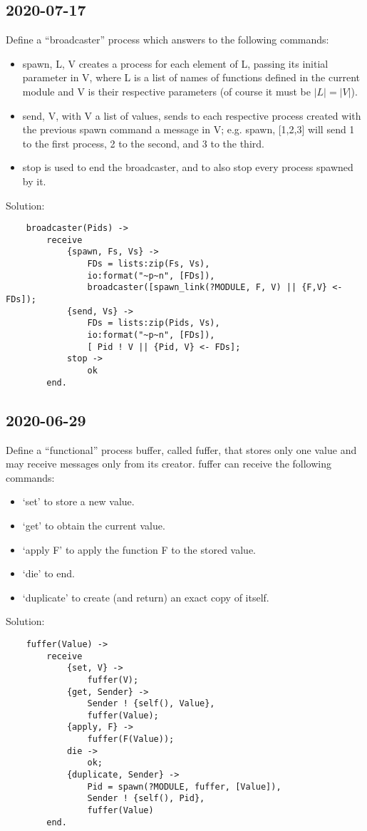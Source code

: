 \subsection{2020-07-17}
Define a ``broadcaster'' process which answers to the following commands:
\begin{itemize}
	\item {spawn, L, V} creates a process for each element of L, passing its initial parameter in V, where L is a list of names of functions defined in the current module and V is their respective parameters (of course it must be $|L| = |V|$).
	\item {send, V}, with V a list of values, sends to each respective process created with the previous spawn command a message in V; e.g. {spawn, [1,2,3]} will send 1 to the first process, 2 to the second, and 3 to the third.
	\item stop is used to end the broadcaster, and to also stop every process spawned by it.
\end{itemize}
Solution:
\begin{lstlisting}
	broadcaster(Pids) ->
		receive
			{spawn, Fs, Vs} ->
				FDs = lists:zip(Fs, Vs),
				io:format("~p~n", [FDs]),
				broadcaster([spawn_link(?MODULE, F, V) || {F,V} <- FDs]);
			{send, Vs} ->
				FDs = lists:zip(Pids, Vs),
				io:format("~p~n", [FDs]),
				[ Pid ! V || {Pid, V} <- FDs];
			stop ->
				ok
		end.
\end{lstlisting}





\subsection{2020-06-29}
Define a ``functional'' process buffer, called fuffer, that stores only one value and may receive messages only from its creator.
fuffer can receive the following commands:
\begin{itemize}
	\item `set' to store a new value.
	\item `get' to obtain the current value.
	\item `apply F' to apply the function F to the stored value.
	\item `die' to end.
	\item `duplicate' to create (and return) an exact copy of itself.
\end{itemize}
Solution:
\begin{lstlisting}
	fuffer(Value) ->
		receive
			{set, V} ->
				fuffer(V);
			{get, Sender} ->
				Sender ! {self(), Value},
				fuffer(Value);
			{apply, F} ->
				fuffer(F(Value));
			die ->
				ok;
			{duplicate, Sender} ->
				Pid = spawn(?MODULE, fuffer, [Value]),
				Sender ! {self(), Pid},
				fuffer(Value)
		end.
\end{lstlisting}





